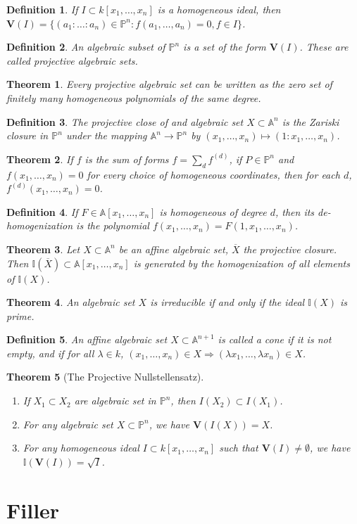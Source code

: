 \documentclass{article}
\theoremstyle{mystyle}
\newtheorem{theorem}{Theorem}[section]
\newtheorem{definition}{Definition}[section]
\begin{document}
\begin{definition}
If $I\subset k[x_1,\hdots ,x_n]$ is a homogeneous ideal, then $\mathbf{V}(I) = \{(a_1:\hdots:a_n)\in \mathbb{P}^n:f(a_1,\hdots, a_n) = 0, f\in I\}$.
\end{definition}
\begin{definition}
An algebraic subset of $\mathbb{P}^n$ is a set of the form $\mathbf{V}(I)$. These are called projective algebraic sets.
\end{definition}
\begin{theorem}
Every projective algebraic set can be written as the zero set of finitely many homogeneous polynomials of the same degree.
\end{theorem}
\begin{definition}
The projective close of and algebraic set $X\subset \mathbb{A}^n$ is the Zariski closure in $\mathbb{P}^n$ under the mapping $\mathbb{A}^n \rightarrow \mathbb{P}^n$ by $(x_1,\hdots, x_n) \mapsto (1:x_1,\hdots, x_n)$.
\end{definition}
\begin{theorem}
If $f$ is the sum of forms $f = \sum_{d} f^{(d)}$, if $P\in \mathbb{P}^n$ and $f(x_1,\hdots, x_n) = 0$ for every choice of homogeneous coordinates, then for each $d$, $f^{(d)}(x_1,\hdots, x_n) = 0$.
\end{theorem}
\begin{definition}
If $F\in \mathbb{A}[x_1,\hdots, x_n]$ is homogeneous of degree $d$, then its de-homogenization is the polynomial $f(x_1,\hdots, x_n) = F(1,x_1,\hdots, x_n)$.
\end{definition}
\begin{theorem}
Let $X\subset \mathbb{A}^n$ be an affine algebraic set, $\overline{X}$ the projective closure. Then $\mathbb{I}(\overline{X})\subset \mathbb{A}[x_1,\hdots, x_n]$ is generated by the homogenization of all elements of $\mathbb{I}(X)$.
\end{theorem}
\begin{theorem}
An algebraic set $X$ is irreducible if and only if the ideal $\mathbb{I}(X)$ is prime.
\end{theorem}
\begin{definition}
An affine algebraic set $X\subset \mathbb{A}^{n+1}$ is called a cone if it is not empty, and if for all $\lambda \in k$, $(x_1,\hdots, x_n) \in X \Rightarrow (\lambda x_1,\hdots, \lambda x_n)\in X$.
\end{definition}
\begin{theorem}[The Projective Nullstellensatz]
\
\begin{enumerate}
    \item If $X_1\subset X_2$ are algebraic set in $\mathbb{P}^n$, then $I(X_2)\subset I(X_1)$.
    \item For any algebraic set $X\subset \mathbb{P}^n$, we have $\mathbf{V}(I(X)) = X$.
    \item For any homogeneous ideal $I\subset k[x_1,\hdots ,x_n]$ such that $\mathbf{V}(I)\ne \emptyset$, we have $\mathbb{I}(\mathbf{V}(I)) = \sqrt{I}$.
\end{enumerate}
\end{theorem}
\section{Filler}
\clearpage
\printglossaries
\end{document}
